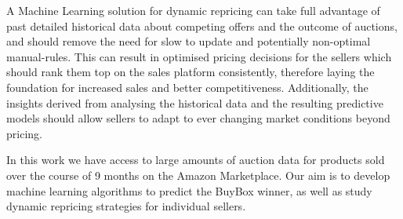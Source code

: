 A Machine Learning solution for dynamic repricing can take full advantage of past 
detailed historical data about competing offers and the outcome of auctions, and should remove the need 
for slow to update and potentially non-optimal manual-rules.
This can result in optimised pricing decisions for the sellers which should rank them top 
on the sales platform consistently, therefore laying the foundation for increased sales and better competitiveness.
Additionally, the insights derived from analysing the historical data and the resulting predictive models should allow sellers 
to adapt to ever changing market conditions beyond pricing. 

In this work we have access to large amounts of auction data 
for products sold over the course of 9 months on the Amazon Marketplace. 
Our aim is to develop machine learning algorithms to predict the BuyBox winner, as well as study  
dynamic repricing strategies for individual sellers.

